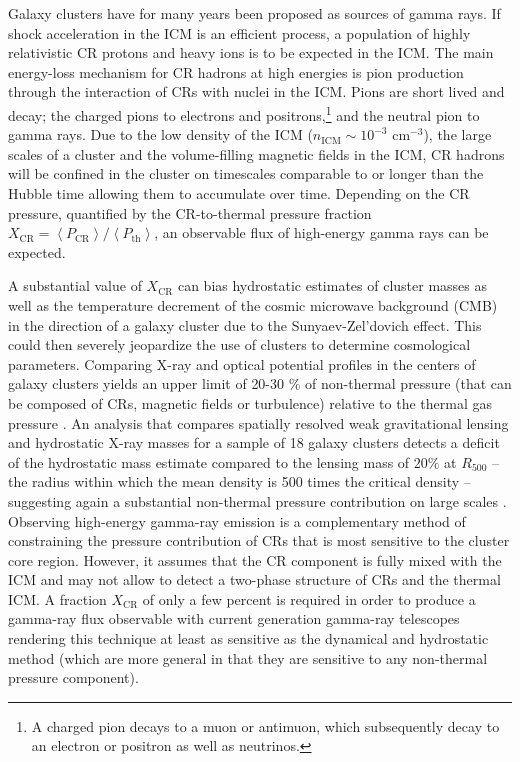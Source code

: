 \documentclass[12pt,manuscript]{aastex}
\newcommand{\expval}[1]{\left\langle #1 \right\rangle}
\newcommand{\CR}{\mathrm{CR}}
\begin{document}
Galaxy clusters have for many years been proposed as sources of gamma rays. If shock acceleration
in the ICM is an efficient process, a population of highly relativistic CR protons and heavy ions is to
be expected in the ICM. The main energy-loss mechanism for CR hadrons at high energies is pion
production through the interaction of CRs with nuclei in the ICM. Pions are short lived and decay; the
charged pions to electrons and positrons,\footnote{A charged pion decays to a muon or antimuon,
which subsequently decay to an electron or positron as well as neutrinos.} and the neutral pion to
gamma rays. Due to the low density of the ICM ($n_{\mathrm{ICM}}\sim 10^{-3}$ cm$^{-3}$), the large
scales of a cluster and the volume-filling magnetic fields in the ICM, CR hadrons will be confined in
the cluster on timescales comparable to or longer than the Hubble time \citep[][]{article:Volk_etal:1996,
article:Berezinsky_etal:1997} allowing them to accumulate over time. Depending on the CR pressure,
quantified by the CR-to-thermal pressure fraction
$X_\CR=\expval{P_{\CR}}/\expval{P_{\mathrm{th}}}$, an observable flux of high-energy gamma rays
can be expected.

A substantial value of $X_\CR$ can bias hydrostatic estimates of cluster masses as well as the
temperature decrement of the cosmic microwave background (CMB) in the direction of a galaxy cluster
due to the Sunyaev-Zel'dovich effect. This could then severely jeopardize the use of clusters to
determine cosmological parameters. Comparing X-ray and optical potential profiles in the centers of
galaxy clusters yields an upper limit of 20-30 \% of non-thermal pressure (that can be composed of
CRs, magnetic fields or turbulence) relative to the thermal gas pressure
\citep{article:Churazov_etal:2008, article:Churazov_etal:2010}. An analysis that compares spatially
resolved weak gravitational lensing and hydrostatic X-ray masses for a sample of 18 galaxy clusters
detects a deficit of the hydrostatic mass estimate compared to the lensing mass of $20 \%$ at
$R_{500}$ -- the radius within which the mean density is 500 times the critical density --
suggesting again a substantial non-thermal pressure contribution on large scales
\citep{article:Mahdavi_etal:2008}. Observing high-energy gamma-ray emission is a complementary
method of constraining the pressure contribution of CRs that is most sensitive to the cluster core
region. However, it assumes that the CR component is fully mixed with the ICM and may not allow to
detect a two-phase structure of CRs and the thermal ICM. A fraction $X_\CR$ of only a few percent is
required in order to produce a gamma-ray flux observable with current generation gamma-ray
telescopes rendering this technique at least as sensitive as the dynamical and hydrostatic method
(which are more general in that they are sensitive to any non-thermal pressure component).
\end{document}
